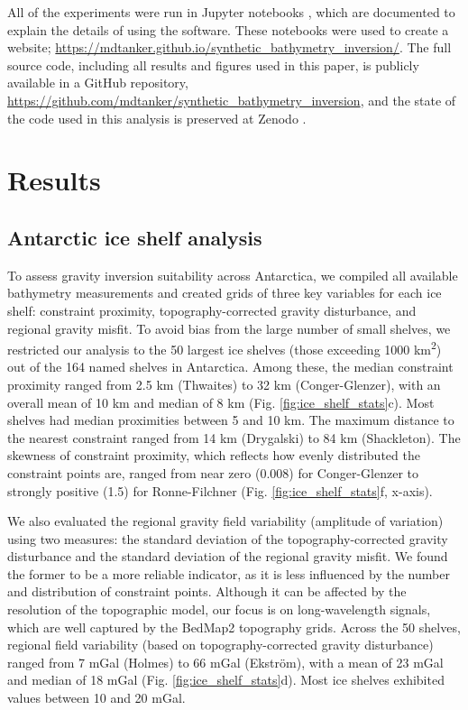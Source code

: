 \documentclass[tc, manuscript]{copernicus}
\begin{document}
All of the experiments were run in Jupyter notebooks \citep{perezipython2007}, which are documented to explain the details of using the software. These notebooks were used to create a website; \url{https://mdtanker.github.io/synthetic_bathymetry_inversion/}. The full source code, including all results and figures used in this paper, is publicly available in a GitHub repository, \url{https://github.com/mdtanker/synthetic_bathymetry_inversion}, and the state of the code used in this analysis is preserved at Zenodo \citep{tankersleygravity2025}.

\section{Results}

\subsection{Antarctic ice shelf analysis}
To assess gravity inversion suitability across Antarctica, we compiled all available bathymetry measurements and created grids of three key variables for each ice shelf: constraint proximity, topography-corrected gravity disturbance, and regional gravity misfit. To avoid bias from the large number of small shelves, we restricted our analysis to the 50 largest ice shelves (those exceeding 1000 km\textsuperscript{2}) out of the 164 named shelves in Antarctica. Among these, the median constraint proximity ranged from 2.5 km (Thwaites) to 32 km (Conger-Glenzer), with an overall mean of 10 km and median of 8 km (Fig. \ref{fig:ice_shelf_stats}c). Most shelves had median proximities between 5 and 10 km. The maximum distance to the nearest constraint ranged from 14 km (Drygalski) to 84 km (Shackleton). The skewness of constraint proximity, which reflects how evenly distributed the constraint points are, ranged from near zero (0.008) for Conger-Glenzer to strongly positive (1.5) for Ronne-Filchner (Fig. \ref{fig:ice_shelf_stats}f, x-axis).

We also evaluated the regional gravity field variability (amplitude of variation) using two measures: the standard deviation of the topography-corrected gravity disturbance and the standard deviation of the regional gravity misfit. We found the former to be a more reliable indicator, as it is less influenced by the number and distribution of constraint points. Although it can be affected by the resolution of the topographic model, our focus is on long-wavelength signals, which are well captured by the BedMap2 topography grids. Across the 50 shelves, regional field variability (based on topography-corrected gravity disturbance) ranged from 7 mGal (Holmes) to 66 mGal (Ekström), with a mean of 23 mGal and median of 18 mGal (Fig. \ref{fig:ice_shelf_stats}d). Most ice shelves exhibited values between 10 and 20 mGal.
\end{document}
